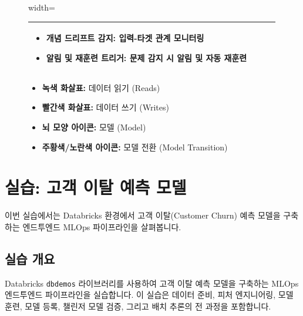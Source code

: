 \documentclass[11pt,a4paper]{article}
\theoremstyle{definition}
\begin{document}
\begin{figure}[h!]
\begin{adjustbox}{width=\textwidth}
\begin{tabular}{p{} | p{} | p{} | p{}}
\begin{itemize}
        \item \textbf{개념 드리프트 감지:} 입력-타겟 관계 모니터링
        \item \textbf{알림 및 재훈련 트리거:} 문제 감지 시 알림 및 자동 재훈련
    \end{itemize} \\
    \bottomrule
    \end{tabular}
    \end{adjustbox}
    \vspace{1em}
    \begin{itemize}
        \item \textbf{녹색 화살표:} 데이터 읽기 (Reads)
        \item \textbf{빨간색 화살표:} 데이터 쓰기 (Writes)
        \item \textbf{뇌 모양 아이콘:} 모델 (Model)
        \item \textbf{주황색/노란색 아이콘:} 모델 전환 (Model Transition)
    \end{itemize}
\end{figure}

\newpage
\section{실습: 고객 이탈 예측 모델}

이번 실습에서는 Databricks 환경에서 고객 이탈(Customer Churn) 예측 모델을 구축하는 엔드투엔드 MLOps 파이프라인을 살펴봅니다.

\subsection{실습 개요}

\begin{summarybox}
Databricks \texttt{dbdemos} 라이브러리를 사용하여 고객 이탈 예측 모델을 구축하는 MLOps 엔드투엔드 파이프라인을 실습합니다. 이 실습은 데이터 준비, 피처 엔지니어링, 모델 훈련, 모델 등록, 챌린저 모델 검증, 그리고 배치 추론의 전 과정을 포함합니다.
\end{summarybox}
\end{document}
